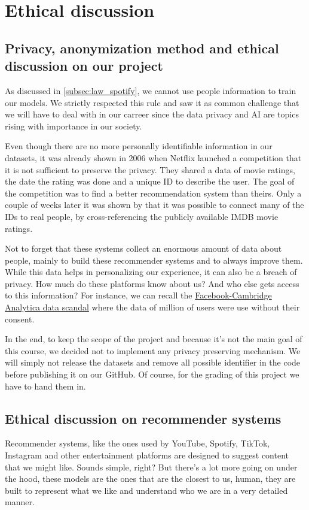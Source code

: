 \chapter{Ethical discussion}
\section{Privacy, anonymization method and ethical discussion on our project}
As discussed in \ref{subsec:law_spotify}, we cannot use people information to train our models. We strictly respected this rule and saw it as common challenge that we will have to deal with in our carreer since the data privacy and AI are topics rising with importance in our society.

Even though there are no more personally identifiable information in our datasets, it was already shown in 2006 when Netflix launched a competition that it is not sufficient to preserve the privacy. They shared a data of movie ratings, the date the rating was done and a unique ID to describe the user. The goal of the competition was to find a better recommendation system than theirs. Only a couple of weeks later it was shown by \cite{4531148} that it was possible to connect many of the IDs to real people, by cross-referencing the publicly available IMDB movie ratings.

Not to forget that these systems collect an enormous amount of data about people, mainly to build these recommender systems and to always improve them. While this data helps in personalizing our experience, it can also be a breach of privacy. How much do these platforms know about us? And who else gets access to this information? For instance, we can recall the \href{https://en.wikipedia.org/wiki/Facebook–Cambridge_Analytica_data_scandal}{Facebook-Cambridge Analytica data scandal} where the data of million of users were use without their consent.

In the end, to keep the scope of the project and because it's not the main goal of this course, we decided not to implement any privacy preserving mechanism. We will simply not release the datasets and remove all possible identifier in the code before publishing it on our GitHub. Of course, for the grading of this project we have to hand them in.

\section{Ethical discussion on recommender systems}
Recommender systems, like the ones used by YouTube, Spotify, TikTok, Instagram and other entertainment platforms are designed to suggest content that we might like. Sounds simple, right? But there's a lot more going on under the hood, these models are the ones that are the closest to us, human, they are built to represent what we like and understand who we are in a very detailed manner.

